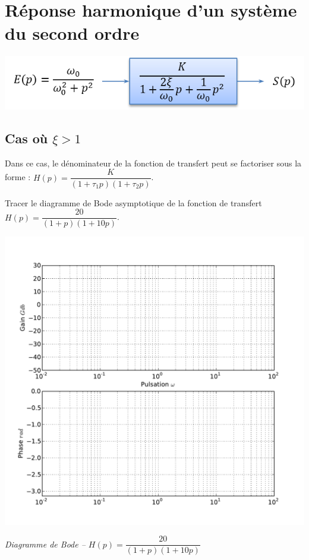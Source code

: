\documentclass[10pt,oneside]{article}
\begin{document}
\section{Réponse harmonique d'un système du second ordre}

\begin{minipage}[c]{.48\linewidth}
\begin{center}
\includegraphics[width=.9\textwidth]{png/ordre2_bloc}
\end{center}
\end{minipage}\hfill
\begin{minipage}[c]{.48\linewidth}
\begin{center}

\end{center}
\end{minipage}

\subsection{Cas où $\xi>1$}
Dans ce cas, le dénominateur de la fonction de transfert peut se factoriser sous la forme :
$H(p)=\dfrac{K}{\left(1+\tau_1 p \right)\left(1+\tau_2 p \right)}$.

Tracer le diagramme de Bode asymptotique de la fonction de transfert 
$H(p)=\dfrac{20}{\left(1+ p \right)\left(1+10 p \right)}$.

\begin{center}
\includegraphics[width=.9\textwidth]{png/bode_vierge}

\textit{Diagramme de Bode -- $H(p)=\dfrac{20}{\left(1+ p \right)\left(1+10 p \right)}$}
\end{center}
\end{document}
